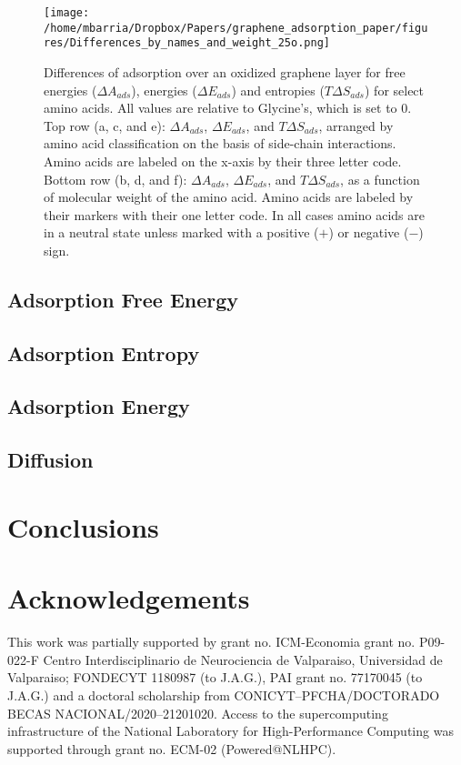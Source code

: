\documentclass[twoside,twocolumn,9pt]{article}
\begin{document}
\begin{figure*}[htbp]
\centerline{\texttt{[image: /home/mbarria/Dropbox/Papers/graphene\_adsorption\_paper/figures/Differences\_by\_names\_and\_weight\_25o.png]}}
\caption[]{\label{fig:differences} Differences of adsorption over an
  oxidized graphene layer for free energies ($\Delta A_{ads}$),
  energies ($\Delta E_{ads}$) and entropies ($T \Delta S_{ads}$) for
  select amino acids. All values are relative to Glycine's, which is
  set to 0. Top row (a, c, and e): $\Delta A_{ads}$,
  $\Delta E_{ads}$, and $T \Delta S_{ads}$, arranged by amino acid
  classification on the basis of side-chain interactions. Amino acids
  are labeled on the x-axis by their three letter code. Bottom row (b,
  d, and f): $\Delta A_{ads}$, $\Delta E_{ads}$, and
  $T \Delta S_{ads}$, as a function of molecular weight of the amino
  acid. Amino acids are labeled by their markers with their one letter
  code. In all cases amino acids are in a neutral state unless marked
  with a positive ($+$) or negative ($-$) sign.}

\end{figure*}

\subsection{Adsorption Free Energy}

\subsection{Adsorption Entropy}

\subsection{Adsorption Energy}

\subsection{Diffusion}

\section{Conclusions}


\section*{Acknowledgements}
This work was partially supported by grant no. ICM-Economia grant
no. P09-022-F Centro Interdisciplinario de Neurociencia de Valparaiso,
Universidad de Valparaiso; FONDECYT 1180987 (to J.A.G.), PAI grant
no. 77170045 (to J.A.G.) and a doctoral scholarship from
CONICYT--PFCHA/DOCTORADO BECAS NACIONAL/2020--21201020.  Access to the
supercomputing infrastructure of the National Laboratory for
High-Performance Computing was supported through grant no. ECM-02
(Powered@NLHPC).




\end{document}

